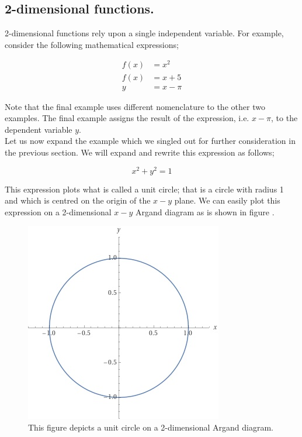 \documentclass{article}
\begin{document}
\subsection{2-dimensional functions.}

2-dimensional functions rely upon a single independent variable. For example, consider the following mathematical
expressions;

\begin{align*}
f(x) &= x^{2} \\
f(x) &= x + 5 \\
y    &= x - \pi
\end{align*}

Note that the final example uses different nomenclature to the other two examples. The final example assigns the
result of the expression, i.e. $x - \pi$, to the dependent variable $y$.\\

Let us now expand the example which we singled out for further consideration in the previous section. We will
expand and rewrite this expression as follows;

\begin{equation}
x^{2} + y^{2} = 1
\end{equation}

This expression plots what is called a unit circle; that is a circle with radius 1 and which is centred on the origin 
of the $x-y$ plane. We can easily plot this expression on a 2-dimensional $x-y$ Argand diagram as is shown in figure .

\begin{figure}
  \begin{center}
  \includegraphics[scale=1.5]{images/Unit_circle.jpg}
  \end{center}
  \caption{This figure depicts a unit circle on a 2-dimensional Argand diagram.}
  \label{fig:Unit_circle}
\end{figure}
\end{document}
